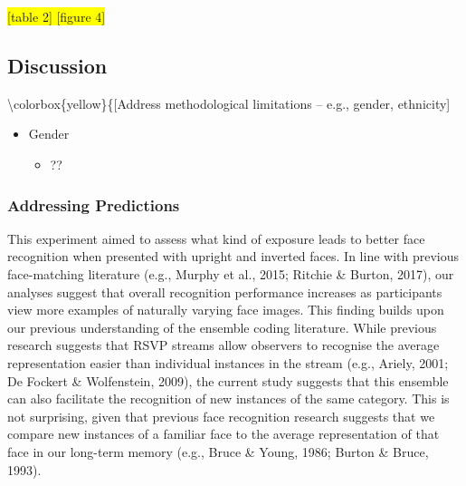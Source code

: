 \documentclass[
  english,
  man]{apa6}
\providecommand{\tightlist}{%
  \setlength{\itemsep}{0pt}\setlength{\parskip}{0pt}}
\begin{document}
\colorbox{yellow}{[table 2]
[figure 4]}

\hypertarget{discussion}{%
\subsection{Discussion}\label{discussion}}

\textbackslash colorbox\{yellow\}\{{[}Address methodological limitations -- e.g., gender, ethnicity{]}

\begin{itemize}
\tightlist
\item
  Gender

  \begin{itemize}
  \tightlist
  \item
    ??
  \end{itemize}
\end{itemize}

\hypertarget{addressing-predictions}{%
\subsubsection{Addressing Predictions}\label{addressing-predictions}}

This experiment aimed to assess what kind of exposure leads to better face recognition when presented with upright and inverted faces. In line with previous face-matching literature (e.g., Murphy et al., 2015; Ritchie \& Burton, 2017), our analyses suggest that overall recognition performance increases as participants view more examples of naturally varying face images. This finding builds upon our previous understanding of the ensemble coding literature. While previous research suggests that RSVP streams allow observers to recognise the average representation easier than individual instances in the stream (e.g., Ariely, 2001; De Fockert \& Wolfenstein, 2009), the current study suggests that this ensemble can also facilitate the recognition of new instances of the same category. This is not surprising, given that previous face recognition research suggests that we compare new instances of a familiar face to the average representation of that face in our long-term memory (e.g., Bruce \& Young, 1986; Burton \& Bruce, 1993).
\end{document}
